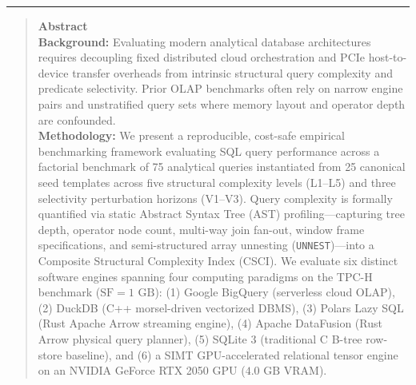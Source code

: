 \documentclass[10pt,a4paper]{article}
\begin{document}
\noindent\rule{\textwidth}{0.8pt}
\begin{quote}
\small\sffamily
\textbf{\color{springerblue}Abstract}\\[0.3em]
\textbf{Background:} Evaluating modern analytical database architectures requires decoupling fixed distributed cloud orchestration and PCIe host-to-device transfer overheads from intrinsic structural query complexity and predicate selectivity. Prior OLAP benchmarks often rely on narrow engine pairs and unstratified query sets where memory layout and operator depth are confounded.\\[0.25em]
\textbf{Methodology:} We present a reproducible, cost-safe empirical benchmarking framework evaluating SQL query performance across a factorial benchmark of 75 analytical queries instantiated from 25 canonical seed templates across five structural complexity levels (L1--L5) and three selectivity perturbation horizons (V1--V3). Query complexity is formally quantified via static Abstract Syntax Tree (AST) profiling---capturing tree depth, operator node count, multi-way join fan-out, window frame specifications, and semi-structured array unnesting (\texttt{UNNEST})---into a Composite Structural Complexity Index (CSCI). We evaluate six distinct software engines spanning four computing paradigms on the TPC-H benchmark ($\text{SF}=1\text{ GB}$): (1) Google BigQuery (serverless cloud OLAP), (2) DuckDB (C++ morsel-driven vectorized DBMS), (3) Polars Lazy SQL (Rust Apache Arrow streaming engine), (4) Apache DataFusion (Rust Arrow physical query planner), (5) SQLite 3 (traditional C B-tree row-store baseline), and (6) a SIMT GPU-accelerated relational tensor engine on an NVIDIA GeForce RTX 2050 GPU ($4.0\text{ GB}$ VRAM).\\[0.25em]

\end{quote}
\end{document}
